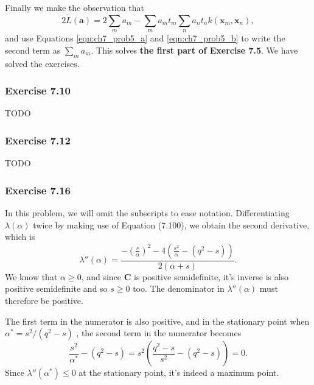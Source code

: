 \documentclass[12pt, a4paper]{article}
\newcommand{\vect}[1]{\bm{#1}}
\begin{document}
Finally we make the observation that 
\begin{equation*}
	2 \tilde{L}(\vect{a})
	=
	2 \sum_m a_m - \sum_m a_m t_m \sum_n a_n t_n k (\vect{x}_m, \vect{x}_n),
\end{equation*}
and use Equations \eqref{eqn:ch7_prob5_a} and \eqref{eqn:ch7_prob5_b} to write the second term as $\sum_m a_m$.
This solves \textbf{the first part of Exercise 7.5}.
We have solved the exercises.








\subsubsection*{Exercise 7.10}
TODO


\subsubsection*{Exercise 7.12}
TODO


\subsubsection*{Exercise 7.16}
In this problem, we will omit the subscripts to ease notation.
Differentiating $\lambda (\alpha)$ twice by making use of Equation (7.100), we obtain the second derivative, which is
\begin{equation*}
	\lambda '' (\alpha)
	=
	\frac{- \left( \frac{s}{\alpha} \right)^2 - 
		4 \left( \frac{s^2}{\alpha} - (q^2 - s) \right)}{2 (\alpha + s)}.
\end{equation*}
We know that $\alpha \geq 0$, and since $\vect{C}$ is positive semidefinite, it's inverse is also positive semidefinite and so $s \geq 0$ too.
The denominator in $\lambda '' (\alpha)$ must therefore be positive.


The first term in the numerator is also positive, and in the stationary point when $\alpha^*  = s^2 / (q^2 - s)$ , the second term in the numerator becomes
\begin{equation*}
	\frac{s^2}{\alpha^*} - (q^2 - s) = s^2 \left( \frac{q^2 - s}{s^2} - (q^2 - s) \right) = 0.
\end{equation*}
Since $\lambda '' (\alpha^*) \leq 0$ at the stationary point, it's indeed a maximum point.

\end{document}
